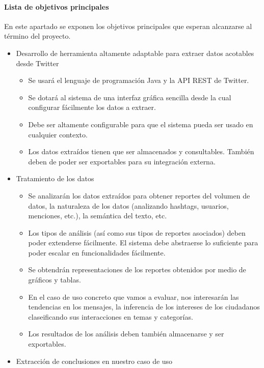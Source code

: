 \paragraph{Lista de objetivos principales}
En este apartado se exponen los objetivos principales que esperan alcanzarse al término del proyecto. 
\begin{itemize}
        \item Desarrollo de herramienta altamente adaptable para extraer datos acotables desde Twitter
        \begin{itemize}
                \item Se usará el lenguaje de programación Java y la API REST de Twitter.
                \item Se dotará al sistema de una interfaz gráfica sencilla desde la cual configurar fácilmente los datos a extraer. 
                \item Debe ser altamente configurable para que el sistema pueda ser usado en cualquier contexto.
                \item Los datos extraídos tienen que ser almacenados y consultables. También deben de poder ser exportables para su integración externa.
        \end{itemize}
       	\item Tratamiento de los datos
       	\begin{itemize}
       		\item Se analizarán los datos extraídos para obtener reportes del volumen de datos, la naturaleza de los datos (analizando hashtags, usuarios, menciones, etc.), la semántica del texto, etc.
       		\item Los tipos de análisis (así como sus tipos de reportes asociados) deben poder extenderse fácilmente. El sistema debe abstraerse lo suficiente para poder escalar en funcionalidades fácilmente.
       		\item Se obtendrán representaciones de los reportes obtenidos por medio de gráficos y tablas. 
       		\item En el caso de uso concreto que vamos a evaluar, nos interesarán las tendencias en los mensajes, la inferencia de los intereses de los ciudadanos claseificando sus interacciones en temas y categorías.
       		\item Los resultados de los análisis deben también almacenarse y ser exportables.
       	\end{itemize}
       \item Extracción de conclusiones en nuestro caso de uso

\end{itemize}
